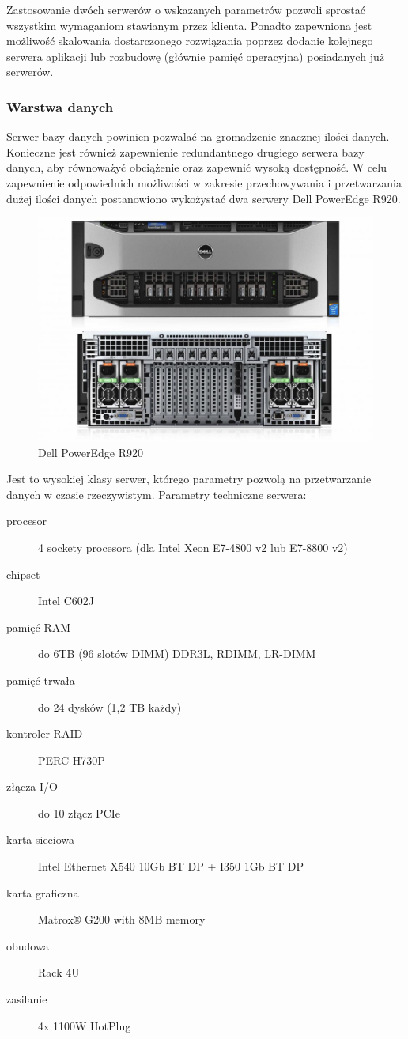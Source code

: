 Zastosowanie dwóch serwerów o wskazanych parametrów pozwoli sprostać
wszystkim wymaganiom stawianym przez klienta. Ponadto zapewniona jest
możliwość skalowania dostarczonego rozwiązania poprzez dodanie
kolejnego serwera aplikacji lub rozbudowę (głównie pamięć operacyjna)
posiadanych już serwerów.

\subsubsection{Warstwa danych}

Serwer bazy danych powinien pozwalać na gromadzenie znacznej ilości
danych. Konieczne jest również zapewnienie redundantnego drugiego
serwera bazy danych, aby równoważyć obciążenie oraz zapewnić wysoką
dostępność. W celu zapewnienie odpowiednich możliwości w zakresie
przechowywania i przetwarzania dużej ilości danych postanowiono
wykożystać dwa serwery Dell PowerEdge R920.

\begin{figure}[H]
	\centering
	\includegraphics[width=\textwidth]{img/r920.jpg}
	\caption{Dell PowerEdge R920}
\end{figure}

Jest to wysokiej klasy serwer, którego parametry pozwolą na
przetwarzanie danych w czasie rzeczywistym. Parametry techniczne
serwera:

\begin{description}
\item[procesor] 4 sockety procesora (dla Intel Xeon E7-4800 v2 lub E7-8800 v2)
\item[chipset] Intel C602J
\item[pamięć RAM] do 6TB (96 slotów DIMM) DDR3L, RDIMM, LR-DIMM
\item[pamięć trwała] do 24 dysków (1,2 TB każdy)
\item[kontroler RAID] PERC H730P
\item[złącza I/O] do 10 złącz PCIe
\item[karta sieciowa] Intel Ethernet X540 10Gb BT DP + I350 1Gb BT DP
\item[karta graficzna] Matrox® G200 with 8MB memory
\item[obudowa] Rack 4U
\item[zasilanie] 4x 1100W HotPlug
\end{description}

